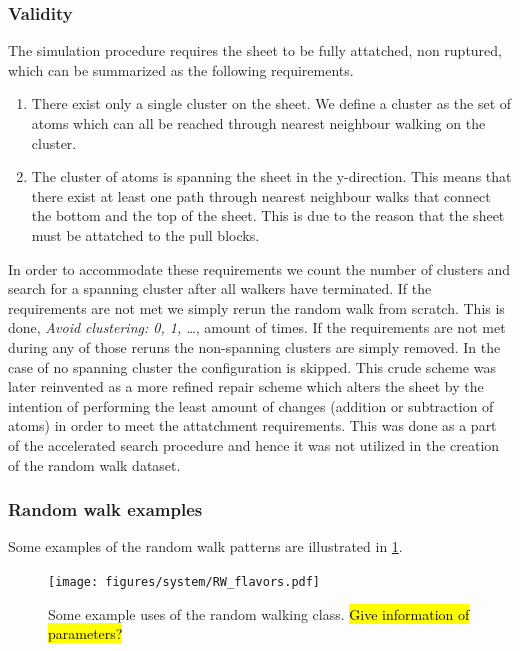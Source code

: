 \subsubsection{Validity}
The simulation procedure requires the sheet to be fully attatched, non ruptured, which can be summarized as the following requirements. 
\begin{enumerate}
  \item There exist only a single cluster on the sheet. We define a cluster as the set of atoms which can all be reached through nearest neighbour walking on the cluster.
  \item The cluster of atoms is spanning the sheet in the y-direction. This means that there exist at least one path through nearest neighbour walks that connect the bottom and the top of the sheet. This is due to the reason that the sheet must be attatched to the pull blocks.
\end{enumerate}
In order to accommodate these requirements we count the number of clusters and search for a spanning cluster after all walkers have terminated. If the requirements are not met we simply rerun the random walk from scratch. This is done, \textit{Avoid clustering: 0, 1, \ldots}, amount of times. If the requirements are not met during any of those reruns the non-spanning clusters are simply removed. In the case of no spanning cluster the configuration is skipped. This crude scheme was later reinvented as a more refined repair scheme which alters the sheet by the intention of performing the least amount of changes (addition or subtraction of atoms) in order to meet the attatchment requirements. This was done as a part of the accelerated search procedure and hence it was not utilized in the creation of the random walk dataset. 

\subsubsection{Random walk examples}

Some examples of the random walk patterns are illustrated in \cref{fig:RW_flavors}.

\begin{figure}[H]
  \centering
  \texttt{[image: figures/system/RW\_flavors.pdf]}
  \caption{Some example uses of the random walking class. \hl{Give information of parameters?}}
  \label{fig:RW_flavors}
\end{figure}
